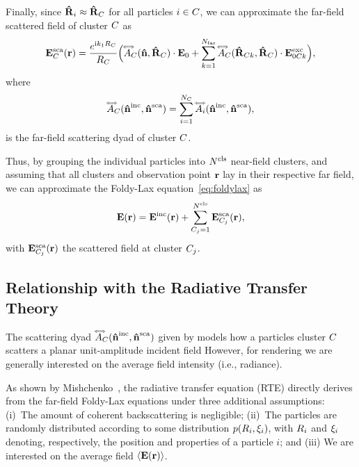 %
Finally, since $\mathbf{\hat{R}}_i\approx\mathbf{\hat{R}}_C$ for all particles $i\in C$, we can approximate the far-field scattered field of cluster $C$ as
%
\begin{equation}
    \mathbf{E}^\text{sca}_C(\mathbf{r}) = \frac{e^{\text{i} k_1 R_C}}{R_C}\Big( \accentset{\Longleftrightarrow}{A}_C(\mathbf{\hat{n}},\mathbf{\hat{R}}_C)\cdot\mathbf{E}_0 + \sum_{k=1}^{N_{\text{far}}} \accentset{\Longleftrightarrow}{A}_C(\mathbf{\hat{R}}_{C k},\mathbf{\hat{R}}_C)\cdot\mathbf{E}^\text{exc}_{0C k} \Big),
    \label{eq:farscatfieldcluster}
\end{equation}
%
where
%
\begin{equation}
   \accentset{\Longleftrightarrow}{A}_C(\mathbf{\hat{n}}^{\text{inc}},\mathbf{\hat{n}}^{\text{sca}}) = \sum_{i=1}^{N_C}\accentset{\Longleftrightarrow}{A}_i(\mathbf{\hat{n}}^{\text{inc}},\mathbf{\hat{n}}^{\text{sca}}),
   \label{eq:farscatdyadC}
\end{equation}
%
is the far-field scattering dyad of cluster $C$.

Thus, by grouping the individual particles into ${N^\text{cls}}$ near-field clusters, and assuming that all clusters and observation point $\mathbf{r}$ lay in their respective far field, we can approximate the Foldy-Lax equation~\eqref{eq:foldylax} as
\begin{equation}
    \mathbf{E}(\mathbf{r}) = \mathbf{E}^\text{inc}(\mathbf{r}) + \sum_{C_j=1}^{{N^\text{cls}}} \mathbf{E}^\text{sca}_{C_j}(\mathbf{r}),
    \label{eq:foldylaxcluster}
\end{equation}
%
with $\mathbf{E}^\text{sca}_{C_j}(\mathbf{r})$ the scattered field at cluster $C_j$. 



\subsection{Relationship with the Radiative Transfer Theory}
\label{ssec:ours_RTT}
%
The scattering dyad $\accentset{\Longleftrightarrow}{A}_C(\mathbf{\hat{n}}^{\text{inc}},\mathbf{\hat{n}}^{\text{sca}})$ given by  models how a particles cluster $C$ scatters a planar unit-amplitude incident field However, for rendering we are generally interested on the average field intensity (i.e., radiance). 

As shown by Mishchenko~, the radiative transfer equation (RTE) directly derives from the far-field Foldy-Lax equations under three additional assumptions: (i)~The amount of coherent backscattering is negligible; (ii)~The particles are randomly distributed according to some distribution $p(R_i,\xi_i)$, with $R_i$ and $\xi_i$ denoting, respectively, the position and properties of a particle $i$; and (iii) We are interested on the average field ${\langle \mathbf{E}(\mathbf{r}) \rangle}$. 

